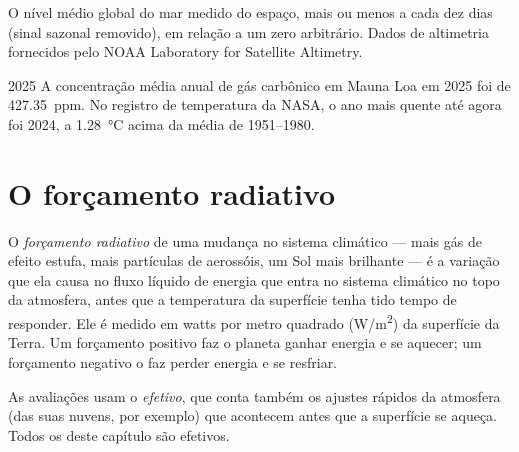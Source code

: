 \begin{omfigure}

{\small O nível médio global do mar medido do espaço, mais ou menos a cada
dez dias (sinal sazonal removido), em relação a um zero arbitrário. Dados de
altimetria fornecidos pelo NOAA Laboratory for Satellite Altimetry.}
\end{omfigure}

\begin{dated}{2025}
A concentração média anual de gás carbônico em Mauna Loa em 2025 foi de
\qty{427.35}{ppm}. No registro de temperatura da NASA, o ano mais quente até
agora foi 2024, a \qty{1.28}{\degreeCelsius} acima da média de 1951--1980.
\end{dated}

\section{O forçamento radiativo}

\begin{definition}\label{def:g12:climate-change:forcing}
O \emph{forçamento radiativo} de uma mudança no
sistema climático --- mais gás de efeito estufa, mais partículas de
aerossóis, um Sol mais brilhante --- é a variação que ela causa no fluxo
líquido de energia que entra no sistema climático no topo da atmosfera,
antes que a temperatura da superfície tenha tido tempo de responder. Ele é
medido em watts por metro quadrado (\unit{W/m^2}) da superfície da Terra.
Um forçamento positivo faz o planeta ganhar energia e se aquecer; um
forçamento negativo o faz perder energia e se resfriar.
\end{definition}

\begin{remark}\label{rem:g12:climate-change:effective}
As avaliações usam o  \emph{efetivo}, que conta também
os ajustes rápidos da atmosfera (das suas nuvens, por exemplo) que
acontecem antes que a superfície se aqueça. Todos os  deste
capítulo são  efetivos.
\end{remark}

